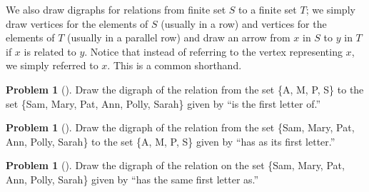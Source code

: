 \documentclass[10pt,]{book}
\theoremstyle{plain}
\theoremstyle{definition}
\newtheorem{activity}[project]{Problem}
\theoremstyle{definition}
\numberwithin{equation}{chapter}
\begin{document}
\hypertarget{p-1876}{}%
We also draw digraphs for relations from finite set \(S\) to a finite set \(T\); we simply draw vertices for the elements of \(S\) (usually in a row) and vertices for the elements of \(T\) (usually in a parallel row) and draw an arrow from \(x\) in \(S\) to \(y\) in \(T\) if \(x\) is related to \(y\). Notice that instead of referring to the vertex representing \(x\), we simply referred to \(x\). This is a common shorthand.%
\begin{activity}[]\marginsymbol[-1em]{} \label{initialdigraph}
\hypertarget{p-1877}{}%
Draw the digraph of the relation from the set \{A, M, P, S\} to the set \{Sam, Mary, Pat, Ann, Polly, Sarah\} given by ``is the first letter of.''%
\end{activity}
\begin{activity}[]\marginsymbol[-1em]{} \label{initialdigraph2}
\hypertarget{p-1878}{}%
Draw the digraph of the relation from the set \{Sam, Mary, Pat, Ann, Polly, Sarah\} to the set \{A, M, P, S\} given by ``has as its first letter.''%
\end{activity}
\begin{activity}[]\marginsymbol[-1em]{} \label{activity-335}
\hypertarget{p-1879}{}%
Draw the digraph of the relation on the set \{Sam, Mary, Pat, Ann, Polly, Sarah\} given by ``has the same first letter as.''%
\end{activity}
\typeout{************************************************}
\typeout{************************************************}
\end{document}
